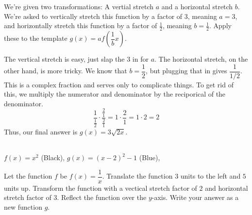 \begin{solution}
We're given two transformations: A vertial stretch $a$ and a horizontal stretch $b$. We're asked to vertically stretch this function by a factor of $3$, meaning $a = 3$, and horizontally stretch this function by a factor of $\frac{1}{2}$, meaning $b = \frac{1}{2}$. Apply these to the template $g(x) = af\left(\dfrac{1}{b}x \right)$. 

The vertical stretch is easy, just slap the $3$ in for $a$. The horizontal stretch, on the other hand, is more tricky. We know that $b = \dfrac{1}{2}$, but plugging that in gives $\dfrac{1}{1/2}$. This is a complex fraction and serves only to complicate things. To get rid of this, we multiply the numerator and denominator by the reciporical of the denominator.
\[
    \frac{1}{\frac{1}{2}}\cdot \frac{\frac{2}{1}}{\frac{2}{1}} =
    1 \cdot \frac{2}{1} = 1 \cdot 2 = 2
\]
Thus, our final answer is $\boxed{g(x) = 3\sqrt{2x}}$.
\begin{center}
    \\
    $f(x) = x^2$ (Black), 
    $g(x) = (x - 2)^2 - 1$ (Blue),
\end{center}
\end{solution} \clearpage
\begin{problem}
    Let the function $f$ be $f(x) = \dfrac{1}{x}$. Translate the function $3$ units to the left and $5$ units up. Transform the function with a vectical stretch factor of $2$ and horizontal stretch factor of $3$. Reflect the function over the $y$-axis. Write your answer as a new function $g$.
\end{problem}

